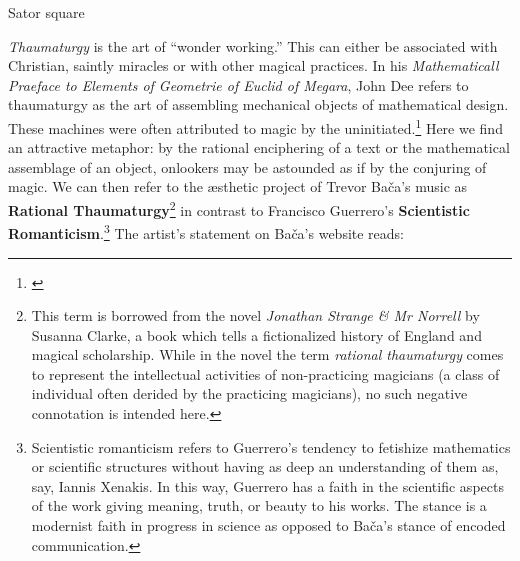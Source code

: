 \begin{table}[H]
\centering
{}
\caption{Sator square}
    \label{tab:sator}
\end{table}

\textit{Thaumaturgy} is the art of ``wonder working.'' This can either be associated with Christian, saintly miracles or with other magical practices. In his \textit{Mathematicall Praeface to Elements of Geometrie of Euclid of Megara}, John Dee refers to thaumaturgy as the art of assembling mechanical objects of mathematical design. These machines were often attributed to magic by the uninitiated.\footnote{\citet{thaumaturgy}} Here we find an attractive metaphor: by the rational enciphering of a text or the mathematical assemblage of an object, onlookers may be astounded as if by the conjuring of magic. We can then refer to the æsthetic project of Trevor Bača's music as \textbf{Rational Thaumaturgy}\footnote{This term is borrowed from the novel \textit{Jonathan Strange \& Mr Norrell} by Susanna Clarke, a book which tells a fictionalized history of England and magical scholarship. While in the novel the term \emph{rational thaumaturgy} comes to represent the intellectual activities of non-practicing magicians (a class of individual often derided by the practicing magicians), no such negative connotation is intended here.} in contrast to Francisco Guerrero's \textbf{Scientistic Romanticism}.\footnote{Scientistic romanticism refers to Guerrero's tendency to fetishize mathematics or scientific structures without having as deep an understanding of them as, say, Iannis Xenakis. In this way, Guerrero has a faith in the scientific aspects of the work giving meaning, truth, or beauty to his works. The stance is a modernist faith in progress in science as opposed to Bača's stance of encoded communication.} The artist's statement on Bača's website reads:

